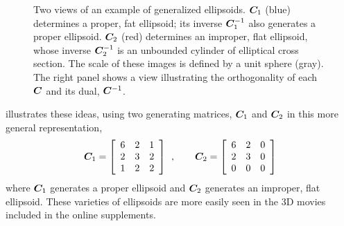 \begin{figure}[htb]
\begin{minipage}[b]{.49\linewidth}
 \end{minipage}
\caption{Two views of an example of generalized ellipsoids.  $\bm{C}_1$  (blue) determines a proper, fat ellipsoid;
its inverse $\bm{C}_1^{-1}$ also generates a proper ellipsoid. $\bm{C}_2$  (red) determines an improper, flat ellipsoid,
whose inverse $\bm{C}_2^{-1}$ is an unbounded cylinder of elliptical cross section.  The scale of these images is defined
by a unit sphere (gray). The right panel shows a view illustrating the orthogonality of each $\bm{C}$ and its dual,  $\bm{C}^{-1}$.
}
\label{fig:gell3d}
\end{figure}

 illustrates these ideas, using two generating matrices, $\bm{C}_1$ and $\bm{C}_2$ in this more
general representation,
\[
\bm{C}_1 = \left[
\begin{array}{ccc}
 6 & 2 & 1  \\
 2 & 3 & 2  \\
 1 & 2 & 2
\end{array}
\right]
\:\: , \quad\quad
\bm{C}_2 = \left[
\begin{array}{ccc}
 6 & 2 & 0  \\
 2 & 3 & 0  \\
 0 & 0 & 0
\end{array}
\right]
\]
where $\bm{C}_1$ generates a proper ellipsoid and $\bm{C}_2$ generates an improper, flat ellipsoid.
These varieties of ellipsoids are more easily seen in the 3D movies included in the online supplements.

